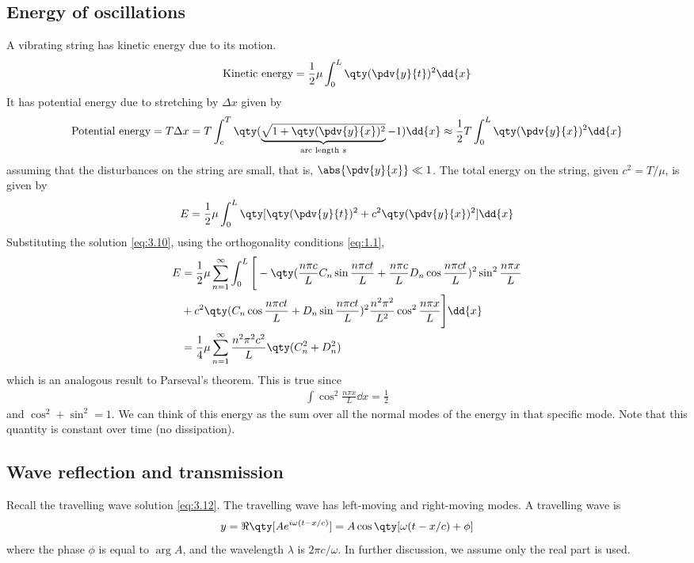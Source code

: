 \subsection{Energy of oscillations}
A vibrating string has kinetic energy due to its motion.
\begin{align*}
	\text{Kinetic energy} = \frac{1}{2} \mu \int_0^L \qty(\pdv{y}{t})^2 \dd{x}
\end{align*}
It has potential energy  due to stretching by $\Delta x$ given by
\begin{align*}
	\text{Potential energy} = T \Delta x = T \int_c^T \qty(\underbrace{\sqrt{1 + \qty(\pdv{y}{x})^2}}_\text{arc length $s$} -1)\dd{x} \approx \frac{1}{2} T \int_0^L \qty(\pdv{y}{x})^2 \dd{x}
\end{align*}
assuming that the disturbances on the string are small, that is, $\abs{\pdv{y}{x}} \ll 1$.
The total energy on the string, given $c^2 = T/\mu$, is given by
\begin{align} \label{eq:3.13}
	E = \frac{1}{2}\mu \int_0^L \qty[\qty(\pdv{y}{t})^2 + c^2 \qty(\pdv{y}{x})^2] \dd{x}
\end{align}
Substituting the solution \cref{eq:3.10}, using the orthogonality conditions \cref{eq:1.1},
\begin{align}
	E &= \frac{1}{2}\mu \sum_{n=1}^\infty \int_0^L \Bigg[-\qty(\frac{n \pi c}{L} C_n \sin \frac{n \pi c t}{L} + \frac{n \pi c}{L} D_n \cos \frac{n \pi c t}{L})^2 \sin^2 \frac{n \pi x}{L}\notag \\
	&+ c^2 \qty(C_n \cos \frac{n \pi c t}{L} + D_n \sin \frac{n \pi c t}{L})^2 \frac{n^2 \pi^2}{L^2} \cos^2 \frac{n \pi x}{L} \Bigg] \dd{x} \notag \\
	&= \frac{1}{4} \mu \sum_{n=1}^\infty \frac{n^2 \pi^2 c^2}{L} \qty(C_n^2 + D_n^2) \label{eq:3.14}
\end{align}
which is an analogous result to Parseval's theorem.
This is true since \begin{align*}
	\int \cos^2 \frac{n \pi x}{L}\dd{x} = \frac{1}{2}
\end{align*} and $\cos^2 + \sin^2 = 1$.
We can think of this energy as the sum over all the normal modes of the energy in that specific mode.
Note that this quantity is constant over time (no dissipation).

\subsection{Wave reflection and transmission}
Recall the travelling wave solution \cref{eq:3.12}.
The travelling wave has left-moving and right-moving modes.
A  travelling wave is
\begin{align*}
	y = \Re\qty[ A e^{i \omega(t-x/c)} ] = A \cos \qty[\omega(t-x/c) + \phi]
\end{align*}
where the phase $\phi$ is equal to $\arg A$, and the wavelength $\lambda$ is $2 \pi c / \omega$.
In further discussion, we assume only the real part is used.

